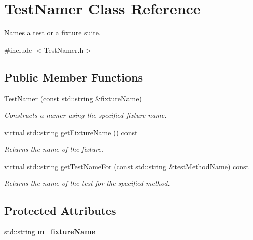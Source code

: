 \hypertarget{class_test_namer}{\section{Test\-Namer Class Reference}
\label{class_test_namer}
}


Names a test or a fixture suite.  




{\ttfamily \#include $<$Test\-Namer.\-h$>$}

\subsection*{Public Member Functions}
\begin{DoxyCompactItemize}
\item 
\hyperlink{class_test_namer_ae2c7e349fae02b71dae8e898946bca9e}{Test\-Namer} (const std\-::string \&fixture\-Name)
\begin{DoxyCompactList}\small\item\em Constructs a namer using the specified fixture name. \end{DoxyCompactList}\item 
virtual std\-::string \hyperlink{class_test_namer_a743cc0b154ff4e32d81feccd97917b62}{get\-Fixture\-Name} () const 
\begin{DoxyCompactList}\small\item\em Returns the name of the fixture. \end{DoxyCompactList}\item 
virtual std\-::string \hyperlink{class_test_namer_aa56007426b92b4c34bb2e98548419893}{get\-Test\-Name\-For} (const std\-::string \&test\-Method\-Name) const 
\begin{DoxyCompactList}\small\item\em Returns the name of the test for the specified method. \end{DoxyCompactList}\end{DoxyCompactItemize}
\subsection*{Protected Attributes}
\begin{DoxyCompactItemize}
\item 
\hypertarget{class_test_namer_a02f9b6344602d27ef8095a54846e9307}{std\-::string {\bfseries m\-\_\-fixture\-Name}}\label{class_test_namer_a02f9b6344602d27ef8095a54846e9307}

\end{DoxyCompactItemize}


